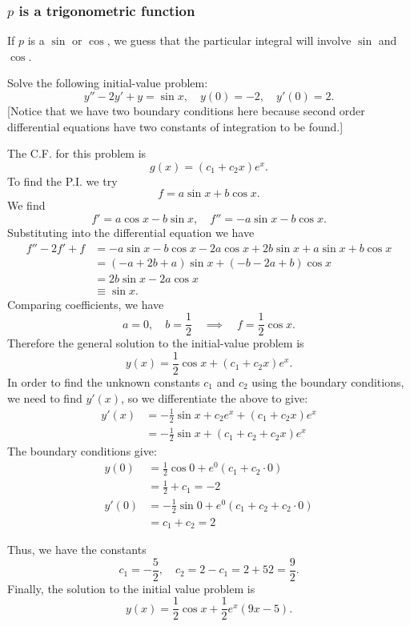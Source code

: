 \subsubsection{$p$ is a trigonometric function}
If $p$ is a $\sin$ or $\cos$, we guess that the particular integral will involve $\sin$ and $\cos$.

\begin{example}
Solve the following initial-value problem:
\[y''-2y'+y=\sin x,\quad y(0)=-2,\quad y'(0)=2.\]
[Notice that we have two boundary conditions here because second order differential equations have two constants of integration to be found.]

The C.F. for this problem is
\[g(x)=(c_1+c_2x)e^x.\]
To find the P.I. we try 
\[f=a\sin x+b\cos x.\]
We find
\[f'=a\cos x-b\sin x,\quad f''= -a\sin x -b\cos x.\]
Substituting into the differential equation we have
\begin{align*}
f''-2f'+f &=  -a\sin x -b\cos x-2a\cos x +2b\sin x+a\sin x+b\cos x \\
&= (-a+2b+a)\sin x+(-b-2a+b)\cos x \\
&= 2b \sin x - 2a\cos x \\
&\equiv \sin x.
\end{align*}
Comparing coefficients, we have
\[a=0,\quad b=\frac{1}{2} \quad \implies \quad f=\frac{1}{2}\cos x.\]
Therefore the general solution to the initial-value problem is 
\[y(x)=\frac{1}{2}\cos x + (c_1+c_2x)e^x.\]
In order to find the unknown constants $c_1$ and $c_2$ using the boundary conditions, we need to find $y'(x)$, so we differentiate the above to give:
\begin{align*}
y'(x)&=-\frac{1}{2}\sin x +c_2e^x+(c_1+c_2x)e^x\\
&=-\frac{1}{2}\sin x + (c_1+c_2+c_2x)e^x
\end{align*}
The boundary conditions give:
\begin{align*}
y(0)&=\frac{1}{2}\cos0+e^0(c_1+c_2\cdot0)\\&=\frac{1}{2}+c_1=-2\\
y'(0)&=-\frac{1}{2}\sin0+e^0(c_1+c_2+c_2\cdot0)\\&=c_1+c_2=2\end{align*}

Thus, we have the constants
\[c_1=-\frac{5}{2}, \quad  c_2=2-c_1=2+{5}{2}=\frac{9}{2}.\]
Finally, the solution to the initial value problem is
\[y(x)=\frac{1}{2}\cos x +\frac{1}{2}e^x(9x-5).\]
\end{example}
